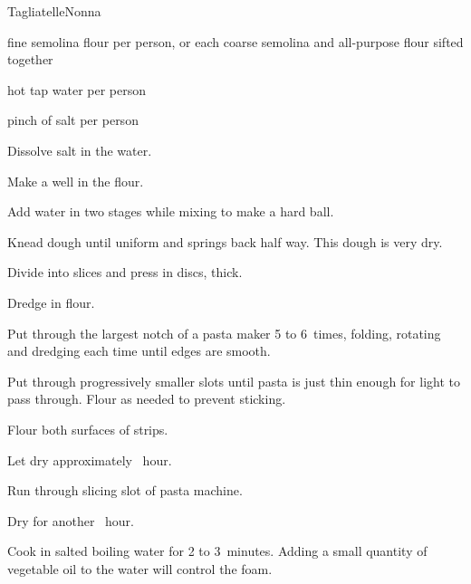 \begin{recipe}{Tagliatelle}{Nonna}{}

\begin{ingredients}
\item {} fine semolina flour per person, or  each coarse semolina and all-purpose flour sifted together
\item {} hot tap water per person
\item pinch of salt per person
\end{ingredients}

\begin{directions}
\item Dissolve salt in the water.
\item Make a well in the flour.
\item Add water in two stages while mixing to make a hard ball.
\item Knead dough until uniform and springs back half way. This dough is very dry.
\item Divide into slices and press in  discs, \inch{\threequarter} thick.
\item Dredge in flour.
\item Put through the largest notch of a pasta maker 5 to 6~times, folding, rotating and dredging each time until edges are smooth.
\item Put through progressively smaller slots until pasta is just thin enough for light to pass through. Flour as needed to prevent sticking.
\item Flour both surfaces of strips.
\item Let dry approximately \half~hour.
\item Run through slicing slot of pasta machine.
\item Dry for another \half~hour.
\item Cook in salted boiling water for 2 to 3~minutes. Adding a small quantity of vegetable oil to the water will control the foam.
\end{directions}

\end{recipe}
